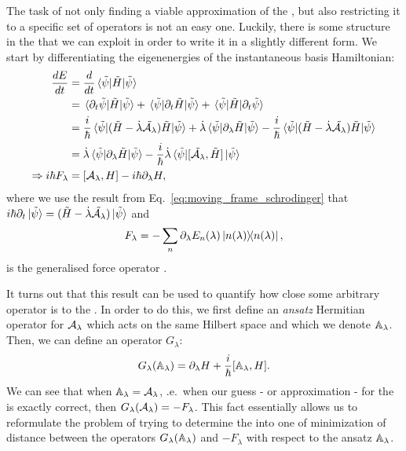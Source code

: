     The task of not only finding a viable approximation of the , but also restricting it to a specific set of operators is not an easy one. Luckily, there is some structure in the  that we can exploit in order to write it in a slightly different form. We start by differentiating the eigenenergies of the instantaneous basis Hamiltonian:
    \begin{equation}\label{eq:energy_derivative}
        \begin{aligned}
            \frac{dE}{dt} &= \frac{d}{dt}\ev*{\Tilde{H}}{\Tilde{\psi}} \\
            &= \mel*{\partial_t \Tilde{\psi}}{\Tilde{H}}{\Tilde{\psi}} + \mel*{\Tilde{\psi}}{\partial_t \Tilde{H}}{\Tilde{\psi}} + \mel*{\Tilde{\psi}}{\Tilde{H}}{\partial_t \Tilde{\psi}} \\
            &= \frac{i}{\hbar}\ev*{(\Tilde{H} - \dotlambda \Tilde{\AGP{\lambda}})\Tilde{H}}{\Tilde{\psi}} + \dotlambda \ev*{\dlambda \Tilde{H}}{\Tilde{\psi}} - \frac{i}{\hbar}\ev*{(\Tilde{H} - \dotlambda \Tilde{\AGP{\lambda}})\Tilde{H}}{\Tilde{\psi}}\\
            &= \dotlambda \ev*{\dlambda \Tilde{H}}{\Tilde{\psi}} - \frac{i}{\hbar} \dotlambda \ev*{\comm*{\Tilde{\AGP{\lambda}}}{\Tilde{H}}}{\Tilde{\psi}} \\
            \Rightarrow i\hbar F_{\lambda} &= \comm{\AGP{\lambda}}{H} - i \hbar \dlambda H,
        \end{aligned}
    \end{equation}
    where we use the result from Eq.~\eqref{eq:moving_frame_schrodinger} that $i\hbar \partial_t \ket*{\Tilde{\psi}} = (\Tilde{H} - \dot{\lambda} \Tilde{\mathcal{A}_{\lambda}})\ket*{\Tilde{\psi}}$ and
    \begin{equation}\label{eq:generalized_force_operator}
        F_{\lambda} = - \sum_n \dlambda E_n(\lambda) \dyad{n(\lambda)},
    \end{equation}
    is the generalised force operator \cite{kolodrubetz_geometry_2017,sels_minimizing_2017,jarzynski_generating_2013}. 

    It turns out that this result can be used to quantify how close some arbitrary operator is to the . In order to do this, we first define an \emph{ansatz} Hermitian operator for $\mathcal{A}_{\lambda}$ which acts on the same Hilbert space and which we denote $\mathbb{A}_{\lambda}$. Then, we can define an operator $G_{\lambda}$:
    \begin{equation}\label{eq:G_operator}
        G_{\lambda}(\approxAGP) = \dlambda H + \frac{i}{\hbar} \comm{\approxAGP}{H}.
    \end{equation}
    We can see that when $\mathbb{A}_{\lambda} = \mathcal{A}_{\lambda}$, \@i.e.~when our guess - or approximation - for the  is exactly correct, then $G_{\lambda}(\mathcal{A}_{\lambda}) = - F_{\lambda}$. This fact essentially allows us to reformulate the problem of trying to determine the  into one of minimization of distance between the operators $G_{\lambda}(\mathbb{A}_{\lambda})$ and $-F_{\lambda}$ with respect to the ansatz $\mathbb{A}_{\lambda}$. 

